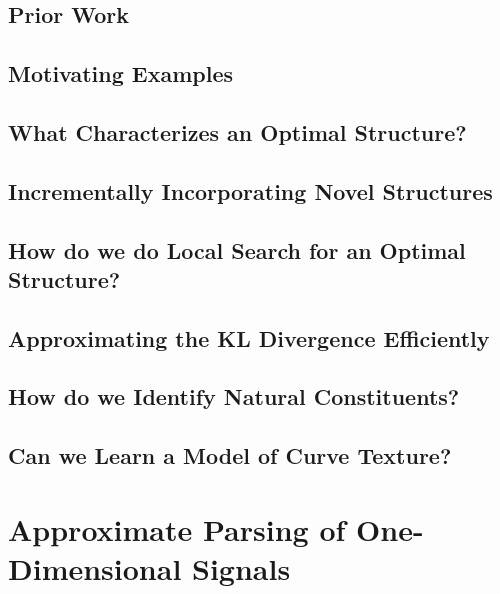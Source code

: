 \documentclass{tufte-book}
\begin{document}
  \section{Prior Work}

  \section{Motivating Examples}

  \section{What Characterizes an Optimal Structure?} 
    

  \section{Incrementally Incorporating Novel Structures}

  \section{How do we do Local Search for an Optimal Structure?}
    

  \section{Approximating the KL Divergence Efficiently}
    

  \section{How do we Identify Natural Constituents?}
    
    

  \section{Can we Learn a Model of Curve Texture?}
    

\chapter{Approximate Parsing of One-Dimensional Signals}
\end{document}
